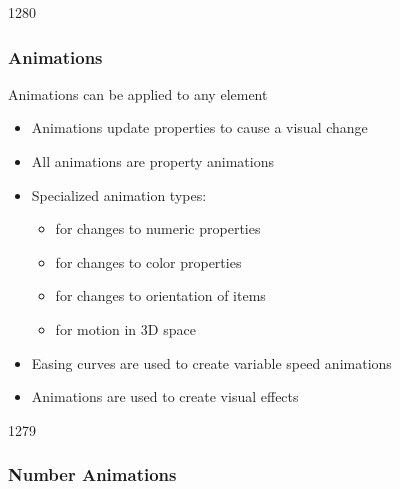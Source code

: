 \begin{slide}{1280}\frametitle{Animations}

Animations can be applied to any element

\begin{itemize}
\item Animations update properties to cause a visual change
\item All animations are property animations
\item Specialized animation types:
  \begin{itemize}
  \item {} for changes to numeric properties
  \item {} for changes to color properties
  \item {} for changes to orientation of items
  \item {} for motion in 3D space
  \end{itemize}
\item Easing curves are used to create variable speed animations
\item Animations are used to create visual effects
\end{itemize}

\end{slide}


\begin{slide}{1279}\frametitle{Number Animations}

                                   
\end{slide}


